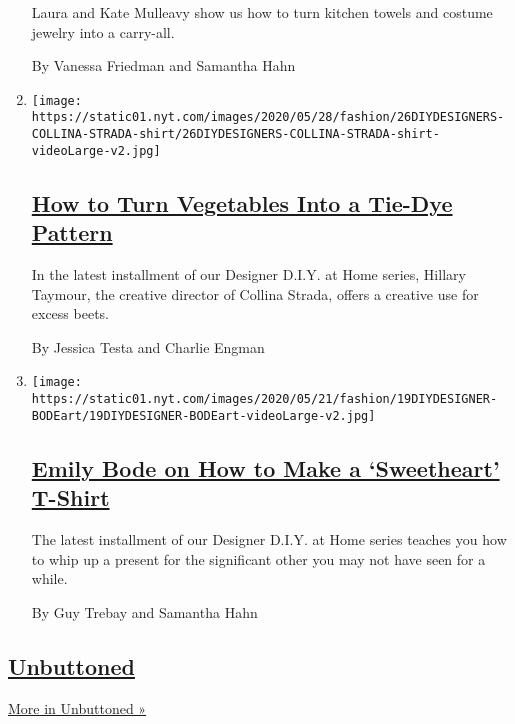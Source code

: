 \begin{enumerate}
  Laura and Kate Mulleavy show us how to turn kitchen towels and costume
  jewelry into a carry-all.

  By Vanessa Friedman and Samantha Hahn
\item
  \texttt{[image: https://static01.nyt.com/images/2020/05/28/fashion/26DIYDESIGNERS-COLLINA-STRADA-shirt/26DIYDESIGNERS-COLLINA-STRADA-shirt-videoLarge-v2.jpg]}

  \hypertarget{how-to-turn-vegetables-into-a-tie-dye-pattern}{%
  \subsection{\texorpdfstring{\href{/2020/05/27/style/tie-dye-plaid-with-collina-strada.html}{How
  to Turn Vegetables Into a Tie-Dye
  Pattern}}{How to Turn Vegetables Into a Tie-Dye Pattern}}\label{how-to-turn-vegetables-into-a-tie-dye-pattern}}

  In the latest installment of our Designer D.I.Y. at Home series,
  Hillary Taymour, the creative director of Collina Strada, offers a
  creative use for excess beets.

  By Jessica Testa and Charlie Engman
\item
  \texttt{[image: https://static01.nyt.com/images/2020/05/21/fashion/19DIYDESIGNER-BODEart/19DIYDESIGNER-BODEart-videoLarge-v2.jpg]}

  \hypertarget{emily-bode-on-how-to-make-a-sweetheart-t-shirt}{%
  \subsection{\texorpdfstring{\href{/2020/05/19/style/emily-bode-sweetheart-t-shirt.html}{Emily
  Bode on How to Make a `Sweetheart'
  T-Shirt}}{Emily Bode on How to Make a `Sweetheart' T-Shirt}}\label{emily-bode-on-how-to-make-a-sweetheart-t-shirt}}

  The latest installment of our Designer D.I.Y. at Home series teaches
  you how to whip up a present for the significant other you may not
  have seen for a while.

  By Guy Trebay and Samantha Hahn
\end{enumerate}

\hypertarget{unbuttoned-1}{%
\subsection{\texorpdfstring{\href{/column/unbuttoned}{Unbuttoned}}{Unbuttoned}}\label{unbuttoned-1}}

\href{/column/unbuttoned}{More in Unbuttoned »}

